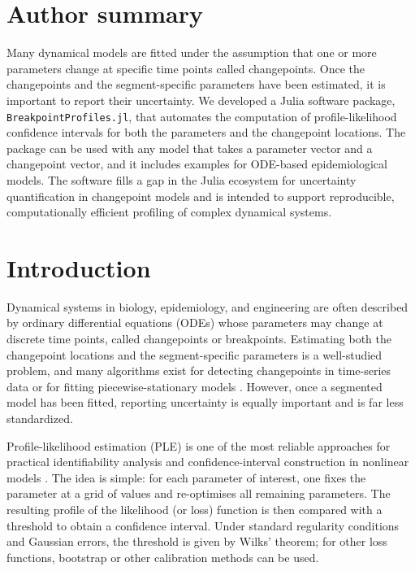 \documentclass[10pt,letterpaper]{article}
\begin{document}
\section*{Author summary}
Many dynamical models are fitted under the assumption that one or more parameters change at specific time points called changepoints. Once the changepoints and the segment-specific parameters have been estimated, it is important to report their uncertainty. We developed a Julia software package, \texttt{BreakpointProfiles.jl}, that automates the computation of profile-likelihood confidence intervals for both the parameters and the changepoint locations. The package can be used with any model that takes a parameter vector and a changepoint vector, and it includes examples for ODE-based epidemiological models. The software fills a gap in the Julia ecosystem for uncertainty quantification in changepoint models and is intended to support reproducible, computationally efficient profiling of complex dynamical systems.

\clearpage
{}
\linenumbers

\section*{Introduction}
Dynamical systems in biology, epidemiology, and engineering are often described by ordinary differential equations (ODEs) whose parameters may change at discrete time points, called changepoints or breakpoints. Estimating both the changepoint locations and the segment-specific parameters is a well-studied problem, and many algorithms exist for detecting changepoints in time-series data or for fitting piecewise-stationary models \cite{killick2012,truong2020,van_den_burg2020}. However, once a segmented model has been fitted, reporting uncertainty is equally important and is far less standardized.

Profile-likelihood estimation (PLE) is one of the most reliable approaches for practical identifiability analysis and confidence-interval construction in nonlinear models \cite{raue2009,d2d2015}. The idea is simple: for each parameter of interest, one fixes the parameter at a grid of values and re-optimises all remaining parameters. The resulting profile of the likelihood (or loss) function is then compared with a threshold to obtain a confidence interval. Under standard regularity conditions and Gaussian errors, the threshold is given by Wilks' theorem; for other loss functions, bootstrap or other calibration methods can be used.
\end{document}
